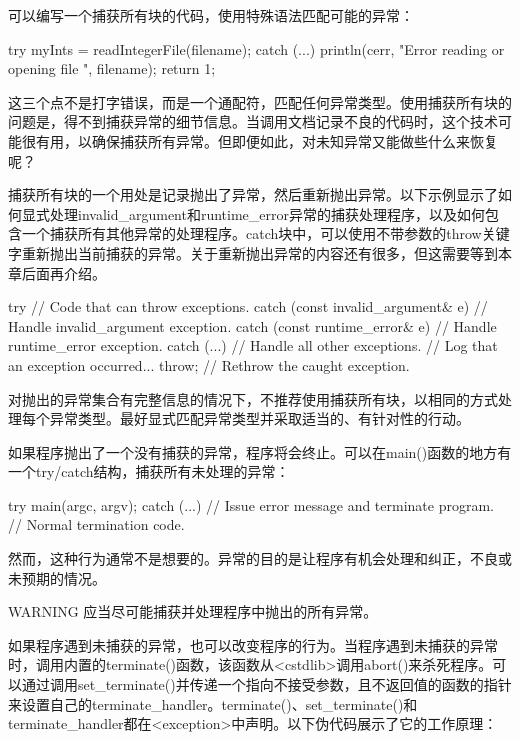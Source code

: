 可以编写一个捕获所有块的代码，使用特殊语法匹配可能的异常：

\begin{cpp}
try {
    myInts = readIntegerFile(filename);
} catch (...) {
    println(cerr, "Error reading or opening file {}", filename);
    return 1;
}
\end{cpp}

这三个点不是打字错误，而是一个通配符，匹配任何异常类型。使用捕获所有块的问题是，得不到捕获异常的细节信息。当调用文档记录不良的代码时，这个技术可能很有用，以确保捕获所有异常。但即便如此，对未知异常又能做些什么来恢复呢？

捕获所有块的一个用处是记录抛出了异常，然后重新抛出异常。以下示例显示了如何显式处理invalid\_argument和runtime\_error异常的捕获处理程序，以及如何包含一个捕获所有其他异常的处理程序。catch块中，可以使用不带参数的throw关键字重新抛出当前捕获的异常。关于重新抛出异常的内容还有很多，但这需要等到本章后面再介绍。

\begin{cpp}
try {
    // Code that can throw exceptions.
} catch (const invalid_argument& e) {
    // Handle invalid_argument exception.
} catch (const runtime_error& e) {
    // Handle runtime_error exception.
} catch (...) {
    // Handle all other exceptions.
    // Log that an exception occurred...
    throw; // Rethrow the caught exception.
}
\end{cpp}

对抛出的异常集合有完整信息的情况下，不推荐使用捕获所有块，以相同的方式处理每个异常类型。最好显式匹配异常类型并采取适当的、有针对性的行动。


如果程序抛出了一个没有捕获的异常，程序将会终止。可以在main()函数的地方有一个try/catch结构，捕获所有未处理的异常：

\begin{cpp}
try {
    main(argc, argv);
} catch (...) {
    // Issue error message and terminate program.
}
// Normal termination code.
\end{cpp}

然而，这种行为通常不是想要的。异常的目的是让程序有机会处理和纠正，不良或未预期的情况。

\begin{myWarning}{WARNING}
应当尽可能捕获并处理程序中抛出的所有异常。
\end{myWarning}

如果程序遇到未捕获的异常，也可以改变程序的行为。当程序遇到未捕获的异常时，调用内置的terminate()函数，该函数从<cstdlib>调用abort()来杀死程序。可以通过调用set\_terminate()并传递一个指向不接受参数，且不返回值的函数的指针来设置自己的terminate\_handler。terminate()、set\_terminate()和terminate\_handler都在<exception>中声明。以下伪代码展示了它的工作原理：

